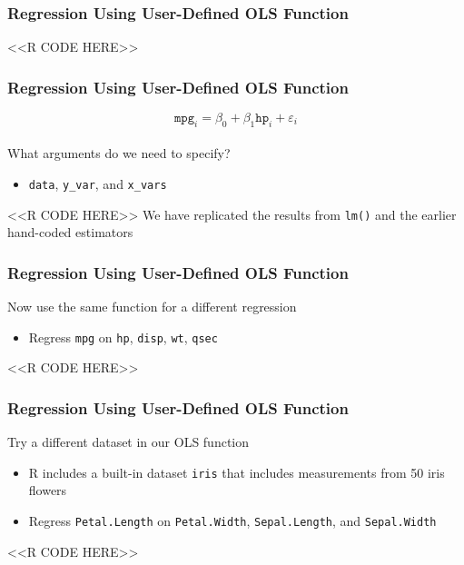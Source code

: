 \documentclass{beamer}
\begin{document}
\begin{frame}[fragile]\frametitle{Regression Using User-Defined OLS Function}
	\vspace{1ex}
    <<R CODE HERE>>
\end{frame}

\begin{frame}[fragile]\frametitle{Regression Using User-Defined OLS Function}
    \vspace{-1ex}
    $$\texttt{mpg}_i = \beta_0 + \beta_1 \texttt{hp}_i + \varepsilon_i$$ \\
    \vspace{2ex}
    What arguments do we need to specify?
    \begin{itemize}
        \item \texttt{data}, \texttt{y\_var}, and \texttt{x\_vars}
    \end{itemize}
    <<R CODE HERE>>
    \vspace{2ex}
    We have replicated the results from \texttt{lm()} and the earlier hand-coded estimators \\
\end{frame}

\begin{frame}[fragile]\frametitle{Regression Using User-Defined OLS Function}
    Now use the same function for a different regression
    \begin{itemize}
        \item Regress \texttt{mpg} on \texttt{hp}, \texttt{disp}, \texttt{wt}, \texttt{qsec}
    \end{itemize}
    <<R CODE HERE>>
\end{frame}

\begin{frame}[fragile]\frametitle{Regression Using User-Defined OLS Function}
    Try a different dataset in our OLS function
    \begin{itemize}
        \item R includes a built-in dataset \texttt{iris} that includes measurements from 50 iris flowers
        \item Regress \texttt{Petal.Length} on \texttt{Petal.Width}, \texttt{Sepal.Length}, and \texttt{Sepal.Width}
    \end{itemize}
    <<R CODE HERE>>
\end{frame}
\end{document}

